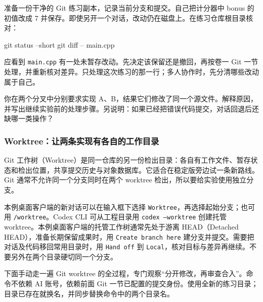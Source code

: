 \begin{example}
准备一份干净的 Git 练习副本，记录当前分支和提交。自己把计分器中 bonus 的初值改成 7 并保存。即使另开一个对话，改动仍在磁盘上。在练习仓库根目录核对：
\begin{tbash}
git status --short
git diff -- main.cpp
\end{tbash}
应看到 \texttt{main.cpp} 有一处未暂存改动。先决定该保留还是撤回，再按卷一 Git 一节处理，并重新核对差异。只处理这次练习的那一行；多人协作时，先分清哪些改动属于自己。
\end{example}

\begin{exercise}\label{ex:ai-workflow-history}
你在两个分叉中分别要求实现 A、B，结果它们修改了同一个源文件。解释原因，并写出继续实验前的处理步骤。另说明：如果已经把错误代码提交，对话回退后还缺哪一类操作？
\end{exercise}

\subsubsection{Worktree：让两条实现有各自的工作目录}

Git 工作树（Worktree）是同一仓库的另一份检出目录：各自有工作文件、暂存状态和检出位置，共享提交历史与对象数据库。它适合在稳定版旁边试一条新路线。Git 通常不允许同一个分支同时在两个 worktree 检出，所以要给实验使用独立分支。

本例桌面客户端的新对话可以在输入框下选择 \texttt{Worktree}，再选择起始分支；也可用 \texttt{/worktree}。Codex CLI 可从工程目录用 \texttt{codex --worktree} 创建托管 worktree。本例桌面客户端的托管工作树通常先处于游离 HEAD（Detached HEAD），准备长期保留成果时，用 \texttt{Create branch here} 建分支并提交。需要把对话及代码移回常用目录时，用 \texttt{Hand off} 到 \texttt{Local}，核对目标与差异再继续。不要另外在两个目录硬切同一个分支。

下面手动走一遍 Git worktree 的全过程，专门观察“分开修改，再审查合入”。命令不依赖 AI 账号，依赖前面 Git 一节已配置的提交身份。使用全新的练习目录；目录已存在就换名，并同步替换命令中的两个目录名。

